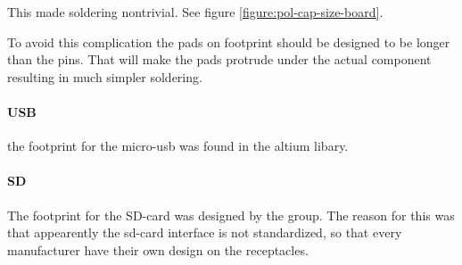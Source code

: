 This made soldering nontrivial. See figure \vref{figure:pol-cap-size-board}.

To avoid this complication the pads on footprint should be designed to be longer than the pins.
That will make the pads protrude under the actual component resulting in much simpler soldering.

\paragraph{USB}

the footprint for the micro-usb was found in the altium libary. 


\paragraph{SD}

The footprint for the SD-card was designed by the group. The reason for this was that appearently the sd-card interface is not standardized, so that 
every manufacturer have their own design on the receptacles. 





